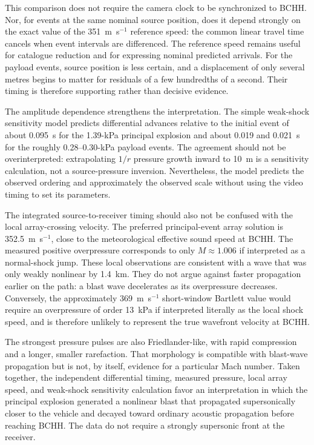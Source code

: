 \documentclass[]{seismica}
\begin{document}
This comparison does not require the camera clock to be synchronized to BCHH.
Nor, for events at the same nominal source position, does it depend strongly on
the exact value of the 351~m~s$^{-1}$ reference speed: the common linear travel
time cancels when event intervals are differenced. The reference speed remains
useful for catalogue reduction and for expressing nominal predicted arrivals.
For the payload events, source position is less certain, and a displacement of
only several metres begins to matter for residuals of a few hundredths of a
second. Their timing is therefore supporting rather than decisive evidence.

The amplitude dependence strengthens the interpretation. The simple weak-shock
sensitivity model predicts differential advances relative to the initial event
of about 0.095~s for the 1.39-kPa principal explosion and about 0.019 and
0.021~s for the roughly 0.28--0.30-kPa payload events. The agreement should not
be overinterpreted: extrapolating $1/r$ pressure growth inward to 10~m is a
sensitivity calculation, not a source-pressure inversion. Nevertheless, the
model predicts the observed ordering and approximately the observed scale
without using the video timing to set its parameters.

The integrated source-to-receiver timing should also not be confused with the
local array-crossing velocity. The preferred principal-event array solution is
352.5~m~s$^{-1}$, close to the meteorological effective sound speed at BCHH.
The measured positive overpressure corresponds to only $M\approx1.006$ if
interpreted as a normal-shock jump. These local observations are consistent
with a wave that was only weakly nonlinear by 1.4~km. They do not argue against
faster propagation earlier on the path: a blast wave decelerates as its
overpressure decreases. Conversely, the approximately 369~m~s$^{-1}$
short-window Bartlett value would require an overpressure of order 13~kPa if
interpreted literally as the local shock speed, and is therefore unlikely to
represent the true wavefront velocity at BCHH.

The strongest pressure pulses are also Friedlander-like, with rapid compression
and a longer, smaller rarefaction. That morphology is compatible with blast-wave
propagation but is not, by itself, evidence for a particular Mach number. Taken
together, the independent differential timing, measured pressure, local array
speed, and weak-shock sensitivity calculation favor an interpretation in which
the principal explosion generated a nonlinear blast that propagated
supersonically closer to the vehicle and decayed toward ordinary acoustic
propagation before reaching BCHH. The data do not require a strongly supersonic
front at the receiver.
\end{document}
